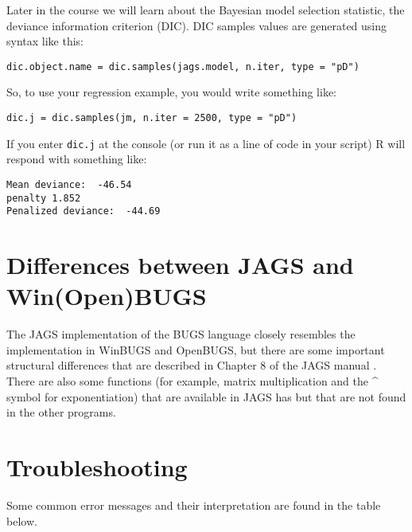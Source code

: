 \documentclass[12pt,english]{article}
\begin{document}
\noindent Later in the course we will learn about the Bayesian model selection statistic, the deviance information criterion (DIC). DIC samples values are generated using syntax like this:

\begin{Verbatim}
dic.object.name = dic.samples(jags.model, n.iter, type = "pD")
\end{Verbatim}

\noindent So, to use your regression example, you would write something like:

\begin{Verbatim}
dic.j = dic.samples(jm, n.iter = 2500, type = "pD")
\end{Verbatim}

\noindent If you enter \texttt{dic.j} at the console (or run it as a line of code in your script) R will respond with something like:

\begin{Verbatim}
Mean deviance:  -46.54
penalty 1.852
Penalized deviance:  -44.69
\end{Verbatim}

\section{Differences between JAGS and Win(Open)BUGS}

The JAGS implementation of the BUGS language closely resembles the implementation in WinBUGS and OpenBUGS, but there are some important structural differences that are described in Chapter 8 of the JAGS manual \citep{Plummer_mannual}. There are also some functions (for example, matrix multiplication and the \textasciicircum{} symbol for exponentiation) that are available in JAGS has but that are not found in the other programs.

\section{Troubleshooting}

Some common error messages and their interpretation are found in the table below.
\end{document}
